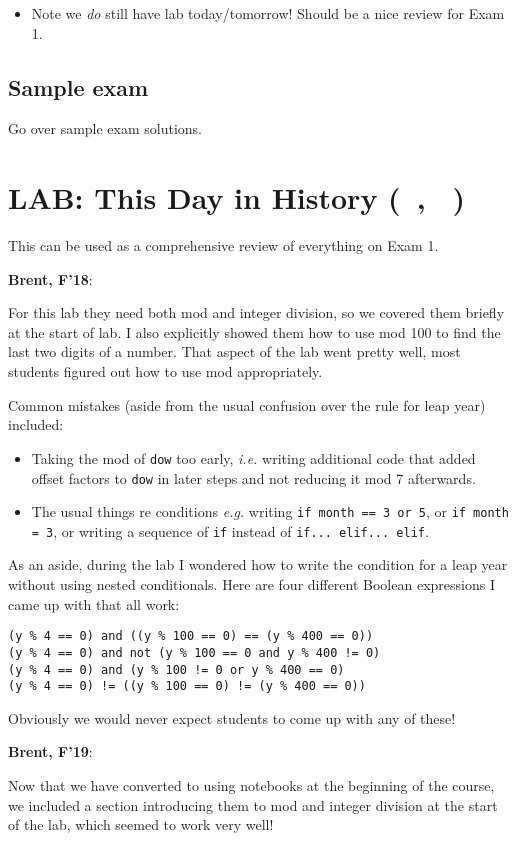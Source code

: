\documentclass{article}
\newenvironment{reflect}[1]
{
  \noindent
  \begin{lrbox}{\reflectbox}
    \begin{minipage}[t]{\textwidth}
      \textbf{#1}:
}{
    \end{minipage}
  \end{lrbox}
  \fbox{\usebox{\reflectbox}}
}
\newcommand{\notready}{\textcolor{red}{\XSolidBold}\xspace}
\newcommand{\shortmonthname}{\StrLeft{\datemonthname}{3}}
\newcommand{\showdate}{\thedateday\ \shortmonthname}
\newcommand{\lab}[1]{\section*{LAB: #1 (\showdate\nextdate, \showdate)}}
\begin{document}
\begin{itemize}
\item Note we \emph{do} still have lab today/tomorrow!  Should be a
  nice review for Exam 1.
\end{itemize}

\subsection*{Sample exam}

Go over sample exam solutions.

\newpage
\lab{\notready This Day in History}

This can be used as a comprehensive review of everything on Exam 1.

\begin{reflect}{Brent, F'18}
  For this lab they need both mod and integer division, so we covered
  them briefly at the start of lab.  I also explicitly showed them how
  to use mod 100 to find the last two digits of a number.  That aspect
  of the lab went pretty well, most students figured out how to use
  mod appropriately.

  Common mistakes (aside from the usual confusion over the rule for
  leap year) included:
  \begin{itemize}
  \item Taking the mod of \verb|dow| too early, \emph{i.e.} writing
    additional code that added offset factors to \verb|dow| in later
    steps and not reducing it mod 7 afterwards.
  \item The usual things re conditions \emph{e.g.} writing \texttt{if month
    == 3 or 5}, or \texttt{if month = 3}, or writing a sequence of
    \verb|if| instead of \texttt{if... elif... elif}.
  \end{itemize}

  As an aside, during the lab I wondered how to write the condition
  for a leap year without using nested conditionals.  Here are four
  different Boolean expressions I came up with that all work:
\begin{verbatim}
(y % 4 == 0) and ((y % 100 == 0) == (y % 400 == 0))
(y % 4 == 0) and not (y % 100 == 0 and y % 400 != 0)
(y % 4 == 0) and (y % 100 != 0 or y % 400 == 0)
(y % 4 == 0) != ((y % 100 == 0) != (y % 400 == 0))
\end{verbatim}
  Obviously we would never expect students to come up with any of these!
\end{reflect}

\begin{reflect}{Brent, F'19}
  Now that we have converted to using notebooks at the beginning of
  the course, we included a section introducing them to mod and
  integer division at the start of the lab, which seemed to work very
  well!
\end{reflect}
\end{document}
